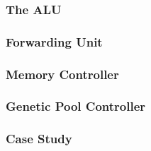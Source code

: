 \subsubsection{The ALU}\label{fpga:fitness:sss:the_alu}

\subsubsection{Forwarding Unit} \label{fpga:fitness:sss:forwarding_unit}

\subsubsection{Memory Controller} \label{fpga:fitness:sss:memory_controller}

\subsubsection{Genetic Pool Controller} \label{fpga:fitness:sss:genetic_pool_controller}

\subsubsection {Case Study} \label{fpga:fitness:sss:case_study}




